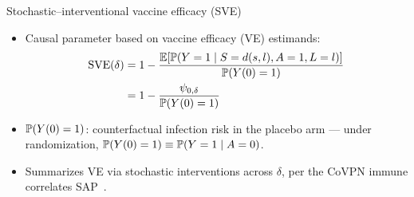 \documentclass{beamer}
\begin{document}

\begin{frame}[c]{Stochastic--interventional vaccine efficacy (SVE)}

\begin{center}
\begin{itemize}
  \itemsep8pt
  \item Causal parameter based on vaccine efficacy (VE) estimands:
  \begin{align*}
    \text{SVE}(\delta) &= 1 - \frac{\mathbb{E}[\mathbb{P}(Y = 1 \mid S = d(s, l), A = 1,
                                    L = l)]}{\mathbb{P}(Y(0)=1)} \\
                       &= 1 - \frac{\psi_{0, \delta}}{\mathbb{P}(Y(0)=1)}
  \end{align*}
  \item $\mathbb{P}(Y(0)=1)$: counterfactual infection risk in the placebo arm ---
    under randomization, $\mathbb{P}(Y(0)=1) \equiv \mathbb{P}(Y=1 \mid A=0)$.
  \item Summarizes VE via stochastic interventions across $\delta$, per the
    CoVPN immune correlates SAP\footnotemark~\citep{gilbert2021covpn,
    gilbert2021immune}.
\end{itemize}
\end{center}

\note{
}


\end{frame}





\end{document}
